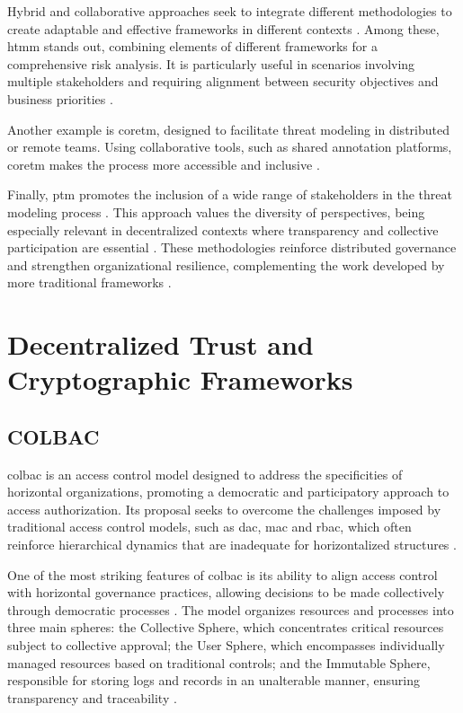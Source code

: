 Hybrid and collaborative approaches seek to integrate different methodologies to
create adaptable and effective frameworks in different contexts
\cite{AHybridThreatModelingMethod, CoReTM}. Among these, \gls{htmm} stands out,
combining elements of different frameworks for a comprehensive risk analysis. It
is particularly useful in scenarios involving multiple stakeholders and
requiring alignment between security objectives and business priorities
\cite{AHybridThreatModelingMethod}.

Another example is \gls{coretm}, designed to facilitate threat modeling in
distributed or remote teams. Using collaborative tools, such as shared
annotation platforms, \gls{coretm} makes the process more accessible and
inclusive \cite{CoReTM}.

Finally, \gls{ptm} promotes the inclusion of a wide range of stakeholders in the
threat modeling process \cite{ParticipatoryThreatModelling}. This approach
values the diversity of perspectives, being especially relevant in
decentralized contexts where transparency and collective participation are
essential \cite{ParticipatoryThreatModelling}. These methodologies reinforce
distributed governance and strengthen organizational resilience, complementing
the work developed by more traditional frameworks \cite{Colbac}.

\section{Decentralized Trust and Cryptographic Frameworks}
\label{sec:decentralized_trust_crypto_frameworks}

\subsection{COLBAC}
\label{subsec:colbac}

\gls{colbac} is an access control model designed to address the specificities of
horizontal organizations, promoting a democratic and participatory approach to
access authorization. Its proposal seeks to overcome the challenges imposed by
traditional access control models, such as \gls{dac}, \gls{mac} and \gls{rbac},
which often reinforce hierarchical dynamics that are inadequate for
horizontalized structures \cite{Colbac}.

One of the most striking features of \gls{colbac} is its ability to align access
control with horizontal governance practices, allowing decisions to be made
collectively through democratic processes \cite{ParticipatoryThreatModelling}.
The model organizes resources and processes into three main spheres: the
Collective Sphere, which concentrates critical resources subject to collective
approval; the User Sphere, which encompasses individually managed resources
based on traditional controls; and the Immutable Sphere, responsible for storing
logs and records in an unalterable manner, ensuring transparency and
traceability \cite{Colbac}.

